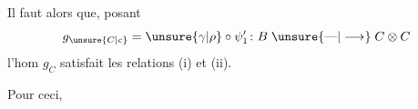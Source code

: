 Il faut  alors que, posant
\[
g_{\unsure{C|c}}=\unsure{\gamma|\rho}\circ\psi'_1
  \colon B\mathrel{\unsure{\text{\textemdash}|\longrightarrow}}C\otimes C
\]
l'hom $g_C$ satisfait les relations (i) et (ii).

Pour ceci, \textendash\ \textendash\ \textendash\ \textendash
